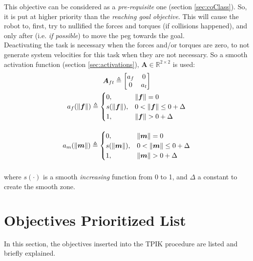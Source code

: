 This objective can be considered as a \textit{pre-requisite} one (section \ref{sec:coClass}). So, it is put at higher priority than the \textit{reaching goal objective}. This will cause the robot to, first, try to nullified the forces and torques (if collisions happened), and only after (i.e. \textit{if possible}) to move the peg towards the goal.\\
Deactivating the task is necessary when the forces and/or torques are zero, to not generate system velocities for this task when they are not necessary. So a smooth activation function (section \ref{sec:activations}), $\boldsymbol{A} \in \mathbb{R}^{2 \times 2}$ is used:
\begin{equation}
	\begin{gathered}
		\boldsymbol{A}_{ft} \triangleq
		\begin{bmatrix}
			a_f & 0 \\
			0 & a_t \\
		\end{bmatrix} \\
		\vspace{10px}
		a_f(\| \boldsymbol{f}\|) \triangleq
		\begin{cases}
			0,& \| \boldsymbol{f}\| = 0\\
			s(\| \boldsymbol{f}\|), & 0 < \| \boldsymbol{f}\| \leq 0 + \Delta\\
			1, & \| \boldsymbol{f}\| > 0 + \Delta\\
		\end{cases} \\
		\vspace{10px}
		a_m(\| \boldsymbol{m}\|) \triangleq
		\begin{cases}
			0,& \| \boldsymbol{m}\| = 0\\
			s(\| \boldsymbol{m}\|), & 0 < \| \boldsymbol{m}\| \leq 0 + \Delta\\
			1, & \| \boldsymbol{m}\| > 0 + \Delta\\
		\end{cases}
	\end{gathered}
\end{equation}  
where $s(\cdot)$ is a smooth \textit{increasing} function from 0 to 1, and $\Delta$ a constant to create the smooth zone. 

\section{Objectives Prioritized List}
In this section, the objectives inserted into the TPIK procedure are listed and briefly explained.\\

